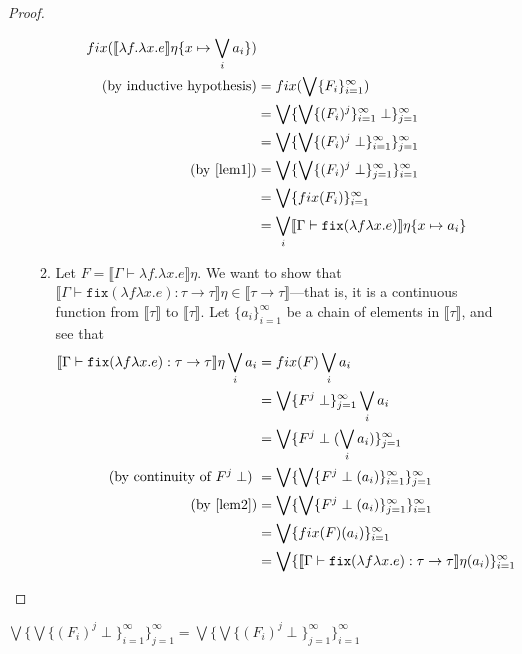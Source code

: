 \begin{proof}
\begin{itemize}
\begin{enumerate}
\begin{align*}
 fix(\llbracket \lambda f. \lambda x.e \rrbracket\eta\{x\mapsto \bigvee_i a_i\})\\
 \text{(by inductive hypothesis)} &= fix(\bigvee\{F_i\}^{\infty}_{i=1}) \\
 &= \bigvee\{\bigvee\{(F_i)^j \}^{\infty}_{i=1}\perp\}^{\infty}_{j=1} \\
 &= \bigvee\{\bigvee\{(F_i)^j \perp\}^{\infty}_{i=1}\}^{\infty}_{j=1} \\ 
\text{(by \ref{lem1})} &= \bigvee\{\bigvee\{(F_i)^j \perp\}^{\infty}_{j=1}\}^{\infty}_{i=1} \\ 
&= \bigvee\{fix(F_i)\}^{\infty}_{i=1}\\
&= \bigvee_i \llbracket \Gamma \vdash \texttt{fix}(\lambda f \lambda x.e)\rrbracket\eta\{x\mapsto a_i\}
 \end{align*}
 \item Let $F = \llbracket \Gamma \vdash \lambda f. \lambda x.e\rrbracket\eta$. We want to show that 
 $\llbracket\Gamma\vdash\texttt{fix}(\lambda f \lambda x.e) : \tau 
 \rightarrow\tau\rrbracket\eta \in \llbracket \tau \rightarrow \tau \rrbracket$---that is, it is a continuous function from 
 $\llbracket \tau \rrbracket$ to $\llbracket \tau \rrbracket$. Let $\{a_i\}^{\infty}_{i=1}$ be a chain of elements in $\llbracket \tau \rrbracket$,
  and see that 
 \begin{align*}
 \llbracket\Gamma\vdash\texttt{fix}(\lambda f \lambda x.e) : \tau \rightarrow\tau\rrbracket\eta \bigvee_i a_i &= 
 fix(F)\bigvee_i a_i\\
 &=\bigvee\{F^j \perp\}^{\infty}_{j=1}\bigvee_i a_i\\
 &= \bigvee\{F^j \perp(\bigvee_i a_i)\}^{\infty}_{j=1}\\ 
 \text{(by continuity of $F^j \perp$) }&= \bigvee\{\bigvee\{F^j \perp(a_i)\}^{\infty}_{i=1}\}^{\infty}_{j=1}\\ 
 \text{(by \ref{lem2})} &=\bigvee\{\bigvee\{F^j \perp(a_i)\}^{\infty}_{j=1}\}^{\infty}_{i=1}\\
 &= \bigvee\{fix(F)(a_i)\}^{\infty}_{i=1}\\
 &= \bigvee\{\llbracket\Gamma\vdash\texttt{fix}(\lambda f \lambda x.e) : \tau \rightarrow\tau\rrbracket\eta(a_i)\}^{\infty}_{i=1}\\
 \end{align*}
 \end{enumerate}
 \end{itemize}
 \end{proof}
 \begin{lemma} $\bigvee\{\bigvee\{(F_i)^j \perp\}^{\infty}_{i=1}\}^{\infty}_{j=1}= \bigvee\{\bigvee\{(F_i)^j \perp\}^{\infty}
 \label{lem1}
 _{j=1}\}^{\infty}_{i=1}$\\
 \end{lemma}
